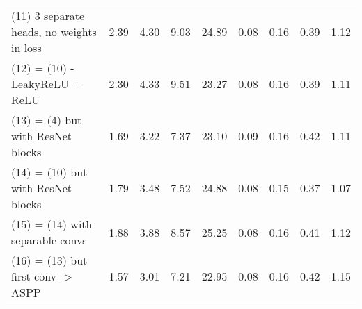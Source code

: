 \begin{table}[h!]
\begin{tabular}{lllllllll}
(11) 3 separate heads, no weights in loss & {\cellcolor[HTML]{D62F27}} \color[HTML]{F1F1F1} 2.39 & {\cellcolor[HTML]{FEDC88}} \color[HTML]{000000} 4.30 & {\cellcolor[HTML]{E2F397}} \color[HTML]{000000} 9.03 & {\cellcolor[HTML]{FFFCBA}} \color[HTML]{000000} 24.89 & {\cellcolor[HTML]{3CA959}} \color[HTML]{F1F1F1} 0.08 & {\cellcolor[HTML]{45AD5B}} \color[HTML]{F1F1F1} 0.16 & {\cellcolor[HTML]{2DA155}} \color[HTML]{F1F1F1} 0.39 & {\cellcolor[HTML]{2AA054}} \color[HTML]{F1F1F1} 1.12 \\
(12) = (10) - LeakyReLU + ReLU & {\cellcolor[HTML]{F16640}} \color[HTML]{F1F1F1} 2.30 & {\cellcolor[HTML]{FED683}} \color[HTML]{000000} 4.33 & {\cellcolor[HTML]{FFF3AC}} \color[HTML]{000000} 9.51 & {\cellcolor[HTML]{B1DE71}} \color[HTML]{000000} 23.27 & {\cellcolor[HTML]{1E9A51}} \color[HTML]{F1F1F1} 0.08 & {\cellcolor[HTML]{17934E}} \color[HTML]{F1F1F1} 0.16 & {\cellcolor[HTML]{39A758}} \color[HTML]{F1F1F1} 0.39 & {\cellcolor[HTML]{1B9950}} \color[HTML]{F1F1F1} 1.11 \\
(13) = (4) but with ResNet blocks & {\cellcolor[HTML]{36A657}} \color[HTML]{F1F1F1} 1.69 & {\cellcolor[HTML]{199750}} \color[HTML]{F1F1F1} 3.22 & {\cellcolor[HTML]{097940}} \color[HTML]{F1F1F1} 7.37 & {\cellcolor[HTML]{A7D96B}} \color[HTML]{000000} 23.10 & {\cellcolor[HTML]{6BBF64}} \color[HTML]{000000} 0.09 & {\cellcolor[HTML]{42AC5A}} \color[HTML]{F1F1F1} 0.16 & {\cellcolor[HTML]{7AC665}} \color[HTML]{000000} 0.42 & {\cellcolor[HTML]{249D53}} \color[HTML]{F1F1F1} 1.11 \\
(14) = (10) but with ResNet blocks & {\cellcolor[HTML]{7FC866}} \color[HTML]{000000} 1.79 & {\cellcolor[HTML]{73C264}} \color[HTML]{000000} 3.48 & {\cellcolor[HTML]{128A49}} \color[HTML]{F1F1F1} 7.52 & {\cellcolor[HTML]{FFFDBC}} \color[HTML]{000000} 24.88 & {\cellcolor[HTML]{15904C}} \color[HTML]{F1F1F1} 0.08 & {\cellcolor[HTML]{097940}} \color[HTML]{F1F1F1} 0.15 & {\cellcolor[HTML]{0E8245}} \color[HTML]{F1F1F1} 0.37 & {\cellcolor[HTML]{097940}} \color[HTML]{F1F1F1} 1.07 \\
(15) = (14) with separable convs & {\cellcolor[HTML]{BDE379}} \color[HTML]{000000} 1.88 & {\cellcolor[HTML]{DCF08F}} \color[HTML]{000000} 3.88 & {\cellcolor[HTML]{AFDD70}} \color[HTML]{000000} 8.57 & {\cellcolor[HTML]{FFF0A6}} \color[HTML]{000000} 25.25 & {\cellcolor[HTML]{279F53}} \color[HTML]{F1F1F1} 0.08 & {\cellcolor[HTML]{1E9A51}} \color[HTML]{F1F1F1} 0.16 & {\cellcolor[HTML]{60BA62}} \color[HTML]{F1F1F1} 0.41 & {\cellcolor[HTML]{30A356}} \color[HTML]{F1F1F1} 1.12 \\
(16) = (13) but first conv -> ASPP & {\cellcolor[HTML]{006837}} \color[HTML]{F1F1F1} 1.57 & {\cellcolor[HTML]{006837}} \color[HTML]{F1F1F1} 3.01 & {\cellcolor[HTML]{006837}} \color[HTML]{F1F1F1} 7.21 & {\cellcolor[HTML]{9BD469}} \color[HTML]{000000} 22.95 & {\cellcolor[HTML]{148E4B}} \color[HTML]{F1F1F1} 0.08 & {\cellcolor[HTML]{18954F}} \color[HTML]{F1F1F1} 0.16 & {\cellcolor[HTML]{8ECF67}} \color[HTML]{000000} 0.42 & {\cellcolor[HTML]{57B65F}} \color[HTML]{F1F1F1} 1.15 \\
\bottomrule
\end{tabular}
\end{table}
